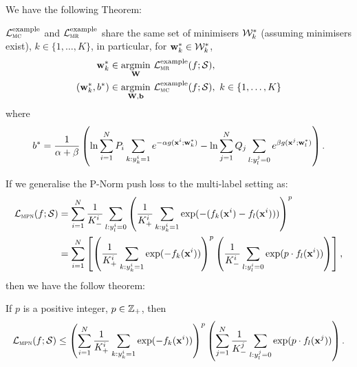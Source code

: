 We have the following Theorem:
\begin{theorem}
\label{theorem:mc2=mr2}
$\mathcal{L}_\textsc{mc}^\mathrm{example}$ and $\mathcal{L}_\textsc{mr}^\mathrm{example}$ share the same set of minimisers $\mathcal{W}_k^*$
(assuming minimisers exist), $k \in \{1,\dots,K\}$, in particular, for $\mathbf{w}_k^* \in \mathcal{W}_k^*$,
\begin{equation*}
\begin{aligned}
       \mathbf{w}_k^* & \in \operatorname*{argmin}_{\mathbf{W}}     \, \mathcal{L}_\textsc{mr}^\mathrm{example}(f; \mathcal{S}), \\
(\mathbf{w}_k^*, b^*) & \in \operatorname*{argmin}_{\mathbf{W},\mathbf{b}} \, \mathcal{L}_\textsc{mc}^\mathrm{example}(f; \mathcal{S}), \ k \in \{1,\dots,K\}
\end{aligned}
\end{equation*}
where
$$
b^*
= \frac{1}{\alpha + \beta} \left(
  \ln \sum_{i=1}^N P_i \sum_{k: y_k^i = 1} e^{-\alpha g(\mathbf{x}^i; \mathbf{w}_k^*)} - \ln \sum_{j=1}^N Q_j \sum_{l: y_l^j = 0} e^{\beta g(\mathbf{x}^j; \mathbf{w}_l^*)} \right).
$$
\end{theorem}


If we generalise the P-Norm push loss to the multi-label setting as:
\begin{equation}
\label{eq:pnorm-ml}
\displaystyle
\begin{aligned}
\mathcal{L}_\textsc{mpn}(f; \mathcal{S})
&= \sum_{i=1}^N \frac{1}{K_-^i} \sum_{l:y_l^i=0} \left( \frac{1}{K_+^i} \sum_{k:y_k^i=1} \exp(-(f_k(\mathbf{x}^i) - f_l(\mathbf{x}^i))) \right)^p \\
&= \sum_{i=1}^N \left[
   \left( \frac{1}{K_+^i} \sum_{k:y_k^i=1} \exp(-f_k(\mathbf{x}^i)) \right)^p 
   \left( \frac{1}{K_-^i} \sum_{l:y_l^i=0} \exp(p \cdot f_l(\mathbf{x}^i)) \right) \right],
\end{aligned}
\end{equation}
then we have the follow theorem:
\begin{theorem}
\label{th:pnorm-ml-ub}
If $p$ is a positive integer, \ie $p \in \mathbb{Z}_+$, then 
\begin{equation}
\label{eq:pnorm-ml-ub}
\displaystyle
\mathcal{L}_\textsc{mpn}(f; \mathcal{S}) \le 
\left( \sum_{i=1}^N \frac{1}{K_+^i} \sum_{k:y_k^i=1} \exp(-f_k(\mathbf{x}^i)) \right)^p 
\left( \sum_{j=1}^N \frac{1}{K_-^j} \sum_{l:y_l^j=0} \exp(p \cdot f_l(\mathbf{x}^j)) \right).
\end{equation}
\end{theorem}
